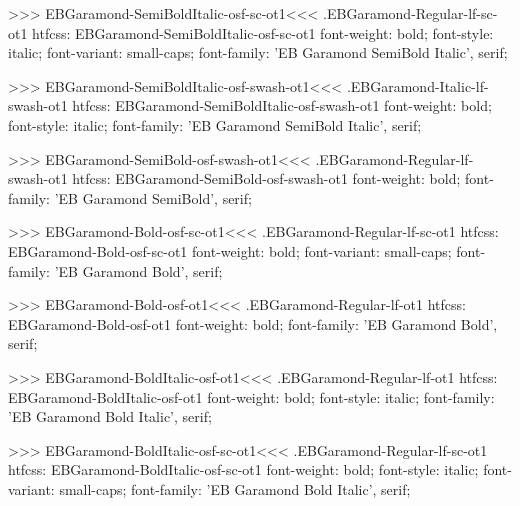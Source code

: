 {{{{{{{>>>
\<EBGaramond-SemiBoldItalic-osf-sc-ot1\><<<
.EBGaramond-Regular-lf-sc-ot1
htfcss:  EBGaramond-SemiBoldItalic-osf-sc-ot1  font-weight: bold; font-style: italic; font-variant: small-caps; font-family: 'EB Garamond SemiBold Italic', serif;

>>>
\<EBGaramond-SemiBoldItalic-osf-swash-ot1\><<<
.EBGaramond-Italic-lf-swash-ot1
htfcss:  EBGaramond-SemiBoldItalic-osf-swash-ot1  font-weight: bold; font-style: italic; font-family: 'EB Garamond SemiBold Italic', serif;

>>>
\<EBGaramond-SemiBold-osf-swash-ot1\><<<
.EBGaramond-Regular-lf-swash-ot1
htfcss:  EBGaramond-SemiBold-osf-swash-ot1  font-weight: bold; font-family: 'EB Garamond SemiBold', serif;

>>>
\<EBGaramond-Bold-osf-sc-ot1\><<<
.EBGaramond-Regular-lf-sc-ot1
htfcss:  EBGaramond-Bold-osf-sc-ot1  font-weight: bold; font-variant: small-caps; font-family: 'EB Garamond Bold', serif;

>>>
\<EBGaramond-Bold-osf-ot1\><<<
.EBGaramond-Regular-lf-ot1
htfcss:  EBGaramond-Bold-osf-ot1  font-weight: bold; font-family: 'EB Garamond Bold', serif;

>>>
\<EBGaramond-BoldItalic-osf-ot1\><<<
.EBGaramond-Regular-lf-ot1
htfcss:  EBGaramond-BoldItalic-osf-ot1  font-weight: bold; font-style: italic; font-family: 'EB Garamond Bold Italic', serif;

>>>
\<EBGaramond-BoldItalic-osf-sc-ot1\><<<
.EBGaramond-Regular-lf-sc-ot1
htfcss:  EBGaramond-BoldItalic-osf-sc-ot1  font-weight: bold; font-style: italic; font-variant: small-caps; font-family: 'EB Garamond Bold Italic', serif;

}}}}}}}
